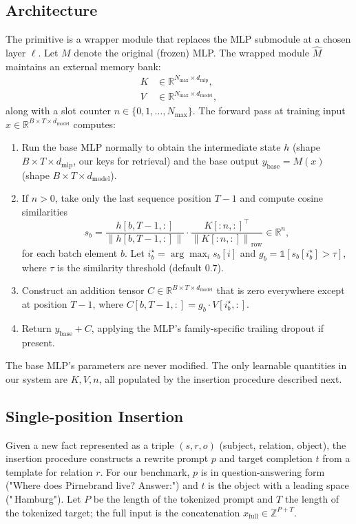 \documentclass[11pt,a4paper]{article}
\newcommand{\R}{\mathbb{R}}
\newcommand{\norm}[1]{\left\|#1\right\|}
\begin{document}
\subsection{Architecture}

The primitive is a wrapper module that replaces the MLP submodule at
a chosen layer $\ell$. Let $M$ denote the original (frozen) MLP. The
wrapped module $\hat M$ maintains an external memory bank:
\begin{align}
K &\in \R^{N_\text{max} \times d_\text{mlp}}, \\
V &\in \R^{N_\text{max} \times d_\text{model}},
\end{align}
along with a slot counter $n \in \{0, 1, \ldots, N_\text{max}\}$. The
forward pass at training input $x \in \R^{B \times T \times d_\text{model}}$
computes:
\begin{enumerate}[leftmargin=*,topsep=2pt,itemsep=1pt]
\item Run the base MLP normally to obtain the intermediate state $h$
(shape $B \times T \times d_\text{mlp}$, our keys for retrieval) and the
base output $y_\text{base} = M(x)$ (shape $B \times T \times d_\text{model}$).
\item If $n > 0$, take only the last sequence position $T-1$ and compute
cosine similarities
\begin{equation}
s_b = \frac{h[b, T-1, :]}{\norm{h[b, T-1, :]}} \cdot \frac{K[:n, :]^\top}{\norm{K[:n, :]}_\text{row}}
\in \R^n,
\end{equation}
for each batch element $b$. Let $i_b^\star = \arg\max_i s_b[i]$ and
$g_b = \mathbb{1}[s_b[i_b^\star] > \tau]$, where $\tau$ is the
similarity threshold (default $0.7$).
\item Construct an addition tensor $C \in \R^{B \times T \times d_\text{model}}$
that is zero everywhere except at position $T-1$, where
$C[b, T-1, :] = g_b \cdot V[i_b^\star, :]$.
\item Return $y_\text{base} + C$, applying the MLP's family-specific
trailing dropout if present.
\end{enumerate}
The base MLP's parameters are never modified. The only learnable
quantities in our system are $K, V, n$, all populated by the insertion
procedure described next.

\subsection{Single-position Insertion}

Given a new fact represented as a triple $(s, r, o)$ (subject,
relation, object), the insertion procedure constructs a rewrite prompt
$p$ and target completion $t$ from a template for relation $r$. For our
benchmark, $p$ is in question-answering form
("Where does Pirnebrand live? Answer:") and $t$ is the object with a
leading space ("\,Hamburg"). Let $P$ be the length of the tokenized
prompt and $T$ the length of the tokenized target; the full input is
the concatenation $x_\text{full} \in \mathbb{Z}^{P+T}$.
\end{document}
